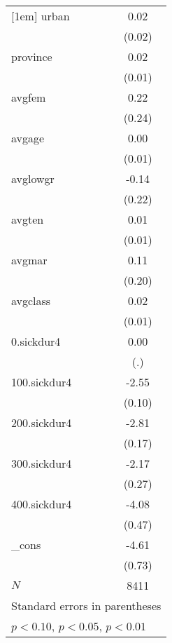 \documentclass{article}
\begin{document}
{\begin{tabular}{l*{1}{c}}
[1em]
urban       &        0.02         \\
            &      (0.02)         \\
[1em]
province    &        0.02         \\
            &      (0.01)         \\
[1em]
avgfem      &        0.22         \\
            &      (0.24)         \\
[1em]
avgage      &        0.00         \\
            &      (0.01)         \\
[1em]
avglowgr    &       -0.14         \\
            &      (0.22)         \\
[1em]
avgten      &        0.01         \\
            &      (0.01)         \\
[1em]
avgmar      &        0.11         \\
            &      (0.20)         \\
[1em]
avgclass    &        0.02         \\
            &      (0.01)         \\
[1em]
0.sickdur4  &        0.00         \\
            &         (.)         \\
[1em]
100.sickdur4&       -2.55\sym{***}\\
            &      (0.10)         \\
[1em]
200.sickdur4&       -2.81\sym{***}\\
            &      (0.17)         \\
[1em]
300.sickdur4&       -2.17\sym{***}\\
            &      (0.27)         \\
[1em]
400.sickdur4&       -4.08\sym{***}\\
            &      (0.47)         \\
[1em]
\_cons      &       -4.61\sym{***}\\
            &      (0.73)         \\
\hline
\(N\)       &        8411         \\
\hline\hline
\multicolumn{2}{l}{\footnotesize Standard errors in parentheses}\\
\multicolumn{2}{l}{\footnotesize \sym{*} \(p<0.10\), \sym{**} \(p<0.05\), \sym{***} \(p<0.01\)}\\
\end{tabular}
}
\end{document}
